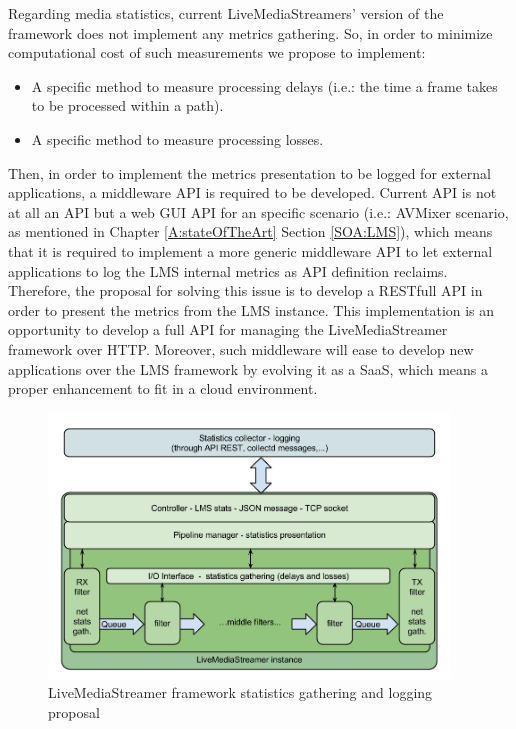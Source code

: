 Regarding media statistics, current LiveMediaStreamers' version of the framework does not implement any metrics gathering. So, in order to minimize computational cost of such measurements we propose to implement:

\begin{itemize}
\item A specific method to measure processing delays (i.e.: the time a frame takes to be processed within a path).
\item A specific method to measure processing losses.
\end{itemize}

Then, in order to implement the metrics presentation to be logged for external applications, a middleware API is required to be developed. Current API is not at all an API but a web GUI API for an specific scenario (i.e.: AVMixer scenario, as mentioned in Chapter \ref{A:stateOfTheArt} Section \ref{SOA:LMS}), which means that it is required to implement a more generic middleware API to let external applications to log the LMS internal metrics as API definition reclaims. Therefore, the proposal for solving this issue is to develop a RESTfull API in order to present the metrics from the LMS instance. This implementation is an opportunity to develop a full API for managing the LiveMediaStreamer framework over HTTP.  Moreover, such middleware will ease to develop new applications over the LMS framework by evolving it as a SaaS, which means a proper enhancement to fit in a cloud environment. 

\begin{figure}[htb]
\begin{center}
\includegraphics[width=0.95\textwidth]{./images/appArch.png}
\caption{LiveMediaStreamer framework statistics gathering and logging proposal}
\label{F:appArch}
\end{center}
\end{figure}

